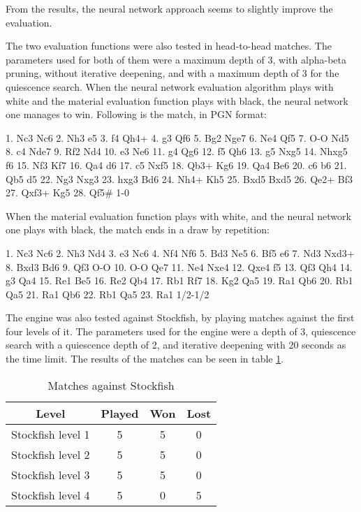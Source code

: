 From the results, the neural network approach seems to slightly improve the evaluation.

The two evaluation functions were also tested in head-to-head matches. The parameters used for both of them were a maximum depth of 3, with alpha-beta pruning, without iterative deepening, and with a maximum depth of 3 for the quiescence search. When the neural network evaluation algorithm plays with white and the material evaluation function plays with black, the neural network one manages to win. Following is the match, in PGN format:

1. Nc3 Nc6 2. Nh3 e5 3. f4 Qh4+ 4. g3 Qf6 5. Bg2 Nge7 6. Ne4 Qf5 7. O-O Nd5 8. c4 Nde7 9. Rf2 Nd4 10. e3 Ne6 11. g4 Qg6 12. f5 Qh6 13. g5 Nxg5 14. Nhxg5 f6 15. Nf3 Kf7 16. Qa4 d6 17. c5 Nxf5 18. Qb3+ Kg6 19. Qa4 Be6 20. c6 b6 21. Qb5 d5 22. Ng3 Nxg3 23. hxg3 Bd6 24. Nh4+ Kh5 25. Bxd5 Bxd5 26. Qe2+ Bf3 27. Qxf3+ Kg5 28. Qf5\# 1-0

When the material evaluation function plays with white, and the neural network one plays with black, the match ends in a draw by repetition:

1. Nc3 Nc6 2. Nh3 Nd4 3. e3 Nc6 4. Nf4 Nf6 5. Bd3 Ne5 6. Bf5 e6 7. Nd3 Nxd3+ 8. Bxd3 Bd6 9. Qf3 O-O 10. O-O Qe7 11. Ne4 Nxe4 12. Qxe4 f5 13. Qf3 Qh4 14. g3 Qa4 15. Re1 Be5 16. Re2 Qb4 17. Rb1 Rf7 18. Kg2 Qa5 19. Ra1 Qb6 20. Rb1 Qa5 21. Ra1 Qb6 22. Rb1 Qa5 23. Ra1 1/2-1/2

The engine was also tested against Stockfish, by playing matches against the first four levels of it. The parameters used for the engine were a depth of 3, quiescence search with a quiescence depth of 2, and iterative deepening with 20 seconds as the time limit. The results of the matches can be seen in table \ref{table:matches}.

\begin{table}[h]
    \centering
    \begin{tabular}{ |c|c|c|c| }
        \hline
        \textbf{Level} & \textbf{Played} & \textbf{Won} & \textbf{Lost} \\
        \hline
        Stockfish level 1 & 5 & 5 & 0 \\
        \hline
        Stockfish level 2 & 5 & 5 & 0 \\
        \hline
        Stockfish level 3 & 5 & 5 & 0 \\
        \hline
        Stockfish level 4 & 5 & 0 & 5 \\
        \hline
    \end{tabular}
    \caption{Matches against Stockfish}
    \label{table:matches}
\end{table}


